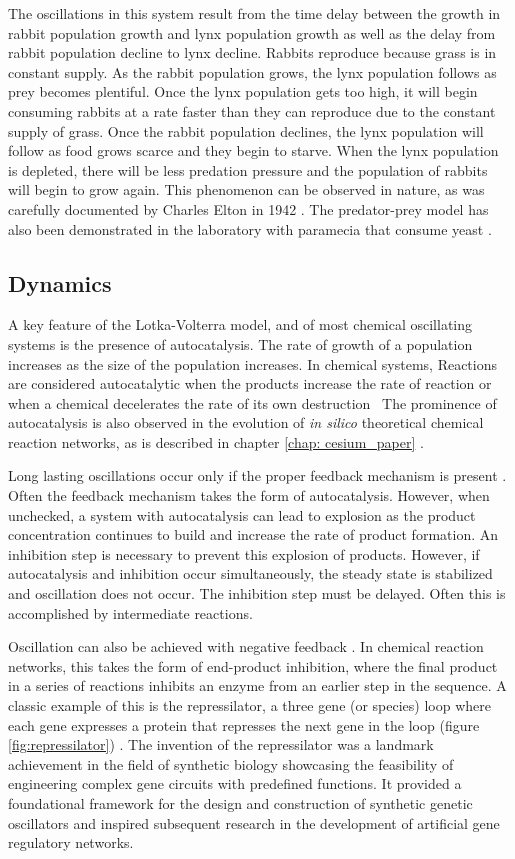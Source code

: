 \documentclass[12pt]{report}
\begin{document}
The oscillations in this system result from the time delay between the growth in rabbit population growth and lynx population growth as well as the delay from rabbit population decline to lynx decline. Rabbits reproduce because grass is in constant supply. As the rabbit population grows, the lynx population follows as prey becomes plentiful. Once the lynx population gets too high, it will begin consuming rabbits at a rate faster than they can reproduce due to the constant supply of grass. Once the rabbit population declines, the lynx population will follow as food grows scarce and they begin to starve. When the lynx population is depleted, there will be less predation pressure and the population of rabbits will begin to grow again. This phenomenon can be observed in nature, as was carefully documented by Charles Elton in 1942 \cite{Elton1942}. The predator-prey model has also been demonstrated in the laboratory with paramecia that consume yeast \cite{Gause}.


\subsection{Dynamics}
A key feature of the Lotka-Volterra model, and of most chemical oscillating systems is the presence of autocatalysis. The rate of growth of a population increases as the size of the population increases. In chemical systems, Reactions are considered autocatalytic when the products increase the rate of reaction or when a chemical decelerates the rate of its own destruction~\cite{Tyson2004}
The prominence of autocatalysis is also observed in the evolution of \textit{in silico} theoretical chemical reaction networks, as is described in chapter \ref{chap: cesium_paper} \cite{Tatka2023}. 

Long lasting oscillations occur only if the proper feedback mechanism is present \cite{Sharma2006}. Often the feedback mechanism takes the form of autocatalysis. However, when unchecked, a system with autocatalysis can lead to explosion as the product concentration continues to build and increase the rate of product formation. An inhibition step is necessary to prevent this explosion of products. However, if autocatalysis and inhibition occur simultaneously, the steady state is stabilized and oscillation does not occur. The inhibition step must be delayed. Often this is accomplished by intermediate reactions. 

Oscillation can also be achieved with negative feedback \cite{Tyson1975, Sauro_dynamics}. In chemical reaction networks, this takes the form of end-product inhibition, where the final product in a series of reactions inhibits an enzyme from an earlier step in the sequence. A classic example of this is the repressilator, a three gene (or species) loop where each gene expresses a protein that represses the next gene in the loop (figure \ref{fig:repressilator}) \cite{Elowitz2000}. The invention of the repressilator was a landmark achievement in the field of synthetic biology showcasing the feasibility of engineering complex gene circuits with predefined functions. It provided a foundational framework for the design and construction of synthetic genetic oscillators and inspired subsequent research in the development of artificial gene regulatory networks.
\end{document}
